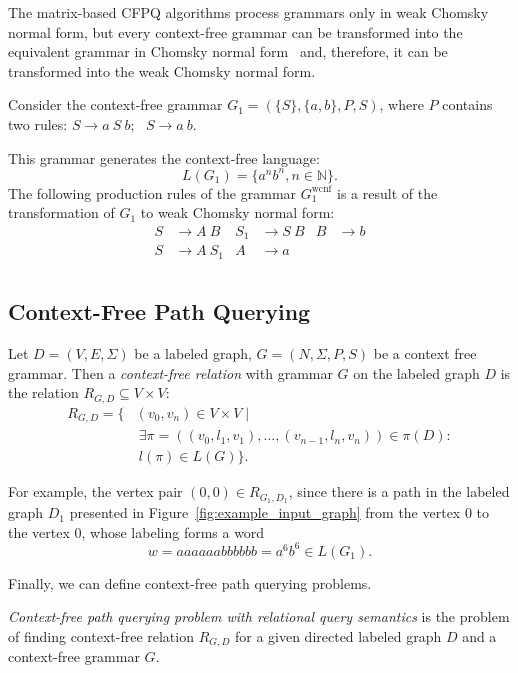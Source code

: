 The matrix-based CFPQ algorithms process grammars only in weak Chomsky normal form, but every context-free grammar can be transformed into the equivalent grammar in Chomsky normal form~\cite{chomsky} and, therefore, it can be transformed into the weak Chomsky normal form.

Consider the context-free grammar $G_1=(\{S\},\{a, b\}, P, S)$, where $P$ contains two rules:
$S \rightarrow a \ S \ b; \ \ \ 
S \rightarrow a \ b
$.

This grammar generates the context-free language: $$L(G_1) = \{a^nb^n, n \in \mathbb{N}\}.$$
The following production rules of the grammar $G_1^{\text{wcnf}}$ is a result of the transformation of $G_1$ to weak Chomsky normal form:
\begin{align*}
S& \to A \ B   & S_1& \to S \ B   & B& \to b  \\
S& \to A \ S_1 & A& \to a &&  \\
\end{align*}


\subsection{Context-Free Path Querying}

\begin{definition}
Let $D = (V, E, \Sigma)$ be a labeled graph, $G = (N, \Sigma, P, S)$ be a context free grammar. Then a \emph{context-free relation} with grammar $G$ on the labeled graph $D$ is the relation $R_{G, D} \subseteq V \times V$:
\begin{equation*} \label{eq1}
\begin{split}
R_{G, D} = \{ &(v_0, v_n) \in V \times V  \mid \\ &\ \exists \pi = ((v_0, l_1, v_1), \ldots, (v_{n-1}, l_n, v_n)) \in \pi(D): \\
      &\ l(\pi) \in L(G) \}.
\end{split}
\end{equation*}
\end{definition}

For example, the vertex pair $(0,0) \in R_{G_1, D_1}$, since there is a path in the labeled graph $D_1$ presented in Figure~\ref{fig:example_input_graph} from the vertex $0$ to the vertex $0$, whose labeling forms a word $$w = aaaaaabbbbbb = a^6b^6 \in L(G_1).$$

Finally, we can define context-free path querying problems.
\begin{definition}
    \emph{Context-free path querying problem with relational query semantics} is the problem of finding context-free relation $R_{G, D}$ for a given directed labeled graph $D$ and a context-free grammar $G$.
\end{definition}

